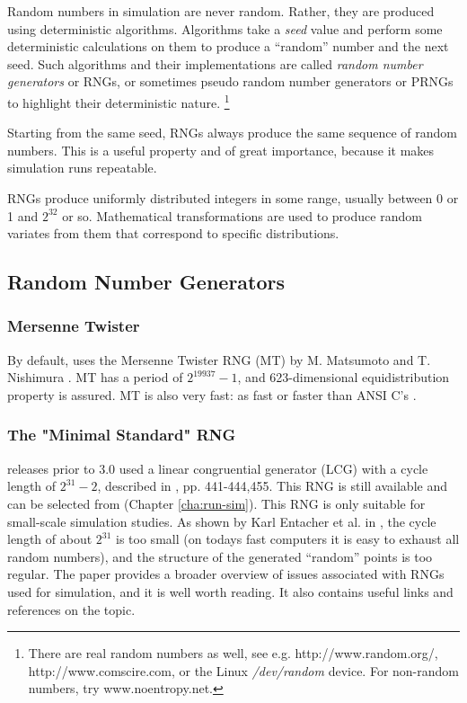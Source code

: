 Random numbers in simulation are never random. Rather, they are
produced using deterministic algorithms. Algorithms take a \textit{seed} value
and perform some deterministic calculations on them to produce
a ``random'' number and the next seed. Such algorithms and their
implementations are called \textit{random number generators} or RNGs,
or sometimes pseudo random number generators or PRNGs to highlight
their deterministic nature.
  \footnote{There are real random numbers as well, see e.g.
  http://www.random.org/, http://www.comscire.com, or the Linux
  \textit{/dev/random} device. For non-random numbers, try www.noentropy.net.}

Starting from the same seed, RNGs always produce the same sequence
of random numbers. This is a useful property and of great importance,
because it makes simulation runs repeatable.

RNGs produce uniformly distributed integers in some range,
usually between 0 or 1 and $2^{32}$ or so. Mathematical transformations
are used to produce random variates from them that correspond to
specific distributions.

\subsection{Random Number Generators}
\label{sec:sim-lib:rngs}

\subsubsection{Mersenne Twister}

By default, {\opp} uses the Mersenne Twister RNG (MT) by M. Matsumoto and
T. Nishimura \cite{Matsumoto98}. MT has a period of $2^{19937}-1$,
and 623-dimensional equidistribution property is assured. MT is
also very fast: as fast or faster than ANSI C's .

\subsubsection{The "Minimal Standard" RNG}

{\opp} releases prior to 3.0 used a linear congruential generator
(LCG) with a cycle length of $2^{31}-2$, described in
\cite{Jain91}, pp. 441-444,455. This RNG is still available
and can be selected from  (Chapter \ref{cha:run-sim}).
This RNG is only suitable for small-scale simulation studies.
As shown by Karl Entacher et al. in \cite{Entacher02},
the cycle length of about $2^{31}$ is too small (on todays
fast computers it is easy to exhaust all random numbers), and
the structure of the generated ``random'' points is too regular.
The \cite{Hellekalek98} paper provides a broader overview of issues
associated with RNGs used for simulation, and it is well worth reading.
It also contains useful links and references on the topic.

